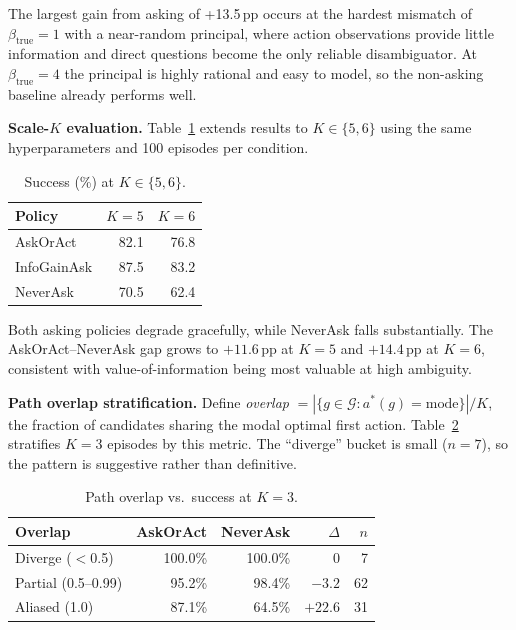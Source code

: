 \documentclass[10pt,twocolumn]{article}
\begin{document}
The largest gain from asking of +13.5\,pp occurs at the hardest mismatch of $\beta_{\text{true}}{=}1$ with a near-random principal, where action observations provide little information and direct questions become the only reliable disambiguator.
At $\beta_{\text{true}}{=}4$ the principal is highly rational and easy to model, so the non-asking baseline already performs well.

\textbf{Scale-$K$ evaluation.}
Table~\ref{tab:scalek} extends results to $K \in \{5,6\}$ using the same hyperparameters and 100 episodes per condition.

\begin{table}[h]
\centering
\caption{Success (\%) at $K{\in}\{5,6\}$.}
\label{tab:scalek}
\small
\begin{tabular}{lrr}
\toprule
Policy & $K{=}5$ & $K{=}6$ \\
\midrule
AskOrAct  & 82.1 & 76.8 \\
InfoGainAsk & 87.5 & 83.2 \\
NeverAsk  & 70.5 & 62.4 \\
\bottomrule
\end{tabular}
\end{table}

Both asking policies degrade gracefully, while NeverAsk falls substantially.
The AskOrAct--NeverAsk gap grows to $+11.6$\,pp at $K{=}5$ and $+14.4$\,pp at $K{=}6$, consistent with value-of-information being most valuable at high ambiguity.

\textbf{Path overlap stratification.}
Define \emph{overlap} $= |\{g \in \mathcal{G} : a^*(g) = \text{mode}\}| / K$, the fraction of candidates sharing the modal optimal first action.
Table~\ref{tab:overlap} stratifies $K{=}3$ episodes by this metric.
The ``diverge'' bucket is small ($n{=}7$), so the pattern is suggestive rather than definitive.

\begin{table}[h]
\centering
\caption{Path overlap vs.\ success at $K{=}3$.}
\label{tab:overlap}
\scriptsize
\begin{tabular}{lrrrr}
\toprule
Overlap & AskOrAct & NeverAsk & $\Delta$ & $n$ \\
\midrule
Diverge ($<$0.5)    & 100.0\% & 100.0\% & $0$     & 7  \\
Partial (0.5--0.99) &  95.2\% &  98.4\% & $-3.2$ & 62 \\
Aliased (1.0)       &  87.1\% &  64.5\% & $+22.6$ & 31 \\
\bottomrule
\end{tabular}
\end{table}
\end{document}

